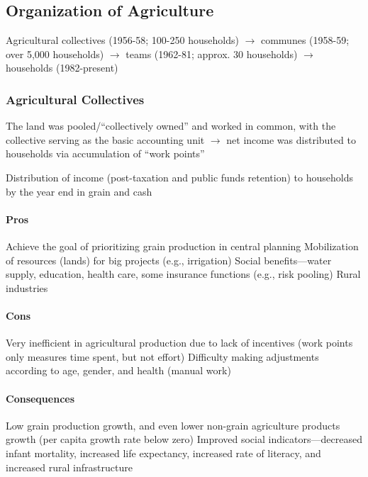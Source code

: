 \documentclass[11pt]{article}
\theoremstyle{definition}
\theoremstyle{remark}
\begin{document}
\subsection{Organization of Agriculture}
Agricultural collectives (1956-58; 100-250 households) $\to$ communes (1958-59; over 5,000 households) $\to$ teams (1962-81; approx. 30 households) $\to$ households (1982-present)

\subsubsection{Agricultural Collectives}
The land was pooled/``collectively owned'' and worked in common, with the collective serving as the basic accounting unit $\to$ net income was distributed to households via accumulation of ``work points''
\begin{outline}[enumerate]
\1 Distribution of income (post-taxation and public funds retention) to households by the year end in grain and cash
\end{outline}

\paragraph{Pros}
\begin{outline}[enumerate]
\1 Achieve the goal of prioritizing grain production in central planning
\1 Mobilization of resources (lands) for big projects (e.g., irrigation)
\1 Social benefits---water supply, education, health care, some insurance functions (e.g., risk pooling)
\1 Rural industries
\end{outline}
\paragraph{Cons}
\begin{outline}[enumerate]
\1 Very inefficient in agricultural production due to lack of incentives (work points only measures time spent, but not effort)
\1 Difficulty making adjustments according to age, gender, and health (manual work)
\end{outline}

\paragraph{Consequences}
\begin{outline}[enumerate]
\1 Low grain production growth, and even lower non-grain agriculture products growth (per capita growth rate below zero)
\1 Improved social indicators---decreased infant mortality, increased life expectancy, increased rate of literacy, and increased rural infrastructure
\end{outline}
\end{document}
